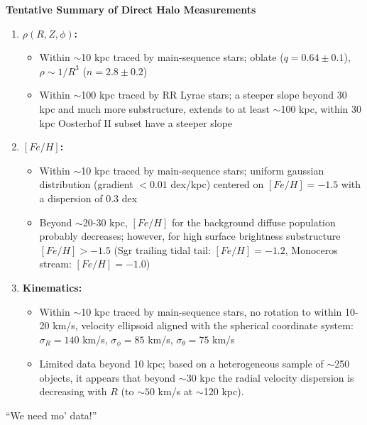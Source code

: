 \documentclass[letterpaper,landscape]{slides}
\begin{document}

\begin{slide}

\begin{center}
\bfseries
\large {} Tentative Summary of Direct Halo Measurements
\end{center}
\vskip 0.2in
\begin{enumerate}
 \item {\color{blue} \bf $\rho(R,Z,\phi)$:} 
   \begin{itemize}
     \item Within $\sim$10 kpc traced by main-sequence stars;
         oblate ($q=0.64\pm0.1$), $\rho \sim 1/R^3$ ($n=2.8\pm0.2$)
     \item Within $\sim$100 kpc traced by RR Lyrae stars; 
         a steeper slope beyond 30 kpc and much more substructure,
         extends to at least $\sim$100 kpc, within 30 kpc Oosterhof II
         subset have a steeper slope 
   \end{itemize}    
 \item {\color{blue} \bf $[Fe/H]$:}
   \begin{itemize}
     \item Within $\sim$10 kpc traced by 
         main-sequence stars; uniform gaussian distribution (gradient 
         $<0.01$ dex/kpc) centered on $[Fe/H]=-1.5$ with a dispersion 
         of 0.3 dex
     \item Beyond $\sim$20-30 kpc, $[Fe/H]$ for the background
         diffuse population probably decreases; however, for high 
         surface brightness substructure $[Fe/H]> -1.5$ (Sgr trailing 
         tidal tail: $[Fe/H]= -1.2$, Monoceros stream: $[Fe/H]= -1.0$)
   \end{itemize}    
 \item {\color{blue} \bf Kinematics:} 
   \begin{itemize}
     \item Within $\sim$10 kpc traced by main-sequence stars, no
	   rotation to within 10-20 km/s, velocity ellipsoid
           aligned with the spherical coordinate system: 
           $\sigma_R=140$ km/s, $\sigma_\phi=85$ km/s,
	   $\sigma_\theta=75$ km/s
     \item Limited data beyond 10 kpc; based on a heterogeneous
        sample of $\sim$250 objects, it appears that beyond $\sim$30 kpc 
        the radial velocity dispersion is decreasing with $R$
        (to $\sim50$ km/s at $\sim$120 kpc).      
   \end{itemize}    
\end{enumerate}    

{\color{red} ``We need mo' data!'' }

\vfill 
\end{slide}


\end{document}
